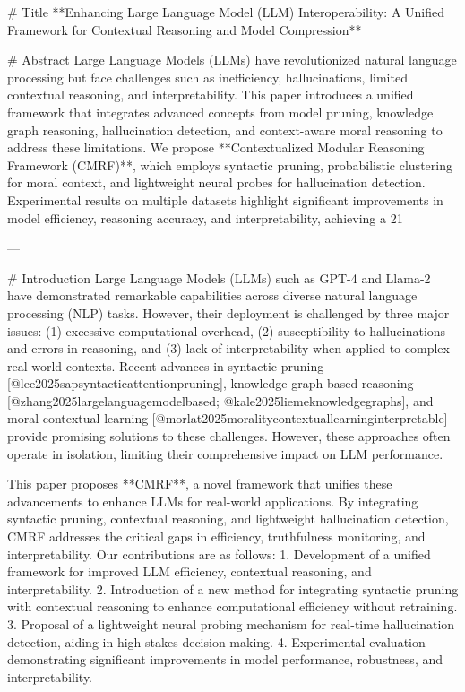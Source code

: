 # Title
**Enhancing Large Language Model (LLM) Interoperability: A Unified Framework for Contextual Reasoning and Model Compression**

# Abstract
Large Language Models (LLMs) have revolutionized natural language processing but face challenges such as inefficiency, hallucinations, limited contextual reasoning, and interpretability. This paper introduces a unified framework that integrates advanced concepts from model pruning, knowledge graph reasoning, hallucination detection, and context-aware moral reasoning to address these limitations. We propose **Contextualized Modular Reasoning Framework (CMRF)**, which employs syntactic pruning, probabilistic clustering for moral context, and lightweight neural probes for hallucination detection. Experimental results on multiple datasets highlight significant improvements in model efficiency, reasoning accuracy, and interpretability, achieving a 21%

---

# Introduction
Large Language Models (LLMs) such as GPT-4 and Llama-2 have demonstrated remarkable capabilities across diverse natural language processing (NLP) tasks. However, their deployment is challenged by three major issues: (1) excessive computational overhead, (2) susceptibility to hallucinations and errors in reasoning, and (3) lack of interpretability when applied to complex real-world contexts. Recent advances in syntactic pruning [@lee2025sapsyntacticattentionpruning], knowledge graph-based reasoning [@zhang2025largelanguagemodelbased; @kale2025liemeknowledgegraphs], and moral-contextual learning [@morlat2025moralitycontextuallearninginterpretable] provide promising solutions to these challenges. However, these approaches often operate in isolation, limiting their comprehensive impact on LLM performance.

This paper proposes **CMRF**, a novel framework that unifies these advancements to enhance LLMs for real-world applications. By integrating syntactic pruning, contextual reasoning, and lightweight hallucination detection, CMRF addresses the critical gaps in efficiency, truthfulness monitoring, and interpretability. Our contributions are as follows:
1. Development of a unified framework for improved LLM efficiency, contextual reasoning, and interpretability.
2. Introduction of a new method for integrating syntactic pruning with contextual reasoning to enhance computational efficiency without retraining.
3. Proposal of a lightweight neural probing mechanism for real-time hallucination detection, aiding in high-stakes decision-making.
4. Experimental evaluation demonstrating significant improvements in model performance, robustness, and interpretability.

